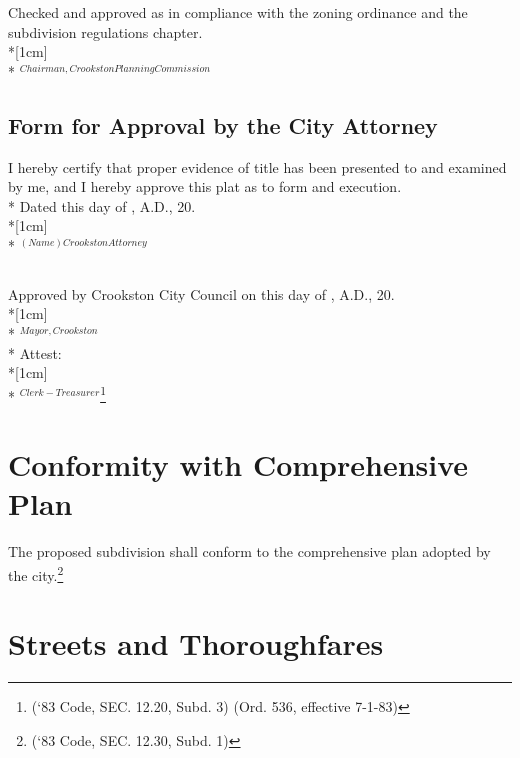 \subsubsection{}
Checked and approved as in compliance with the zoning ordinance and the subdivision regulations chapter.\\*[1cm]
\fillable{5cm}\\*
$^{Chairman, Crookston Planning Commission}$
\subsection{Form for Approval by the City Attorney}
I hereby certify that proper evidence of title has been presented to and examined by me, and I hereby approve this plat as to form and execution.\\*
Dated this \fillable{1cm} day of \fillable{2cm}, A.D., 20\fillable{1cm}.\\*[1cm]
\fillable{5cm}\\*
$^{(Name) Crookston Attorney}$
\subsection{}
Approved by Crookston City Council on this \fillable{1cm} day of \fillable{2cm}, A.D., 20\fillable{1cm}.\\*[1cm]
\fillable{5cm}\\*
$^{Mayor, Crookston}$\\*
Attest:\\*[1cm]
\fillable{5cm}\\*
$^{Clerk-Treasurer}$\footnote{(‘83 Code, SEC. 12.20, Subd. 3)  (Ord. 536, effective 7-1-83)}


\setcounter{section}{29}
\section{Conformity with Comprehensive Plan}
The proposed subdivision shall conform to the comprehensive plan adopted by the city.\footnote{(‘83 Code, SEC. 12.30, Subd. 1)}

\section{Streets and Thoroughfares}
